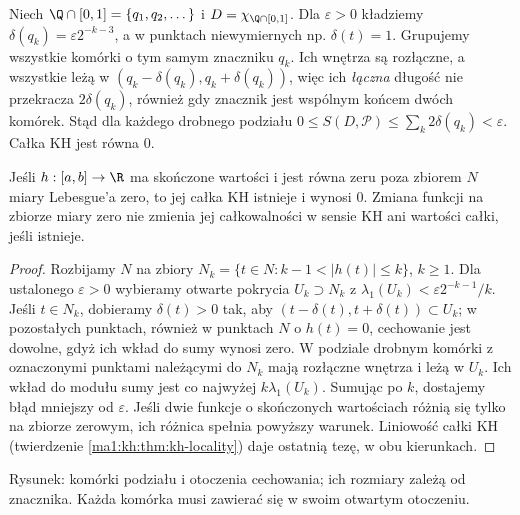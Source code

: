 \begin{przyklad}\label{ma1:kh:ex:dirichlet}
Niech $\Q\cap[0,1]=\{q_1,q_2,\dots\}$ i $D=\chi_{\Q\cap[0,1]}$. Dla $\varepsilon>0$ kładziemy $\delta(q_k)=\varepsilon 2^{-k-3}$, a w punktach niewymiernych np. $\delta(t)=1$. Grupujemy wszystkie komórki o tym samym znaczniku $q_k$. Ich wnętrza są rozłączne, a wszystkie leżą w $(q_k-\delta(q_k),q_k+\delta(q_k))$, więc ich \emph{łączna} długość nie przekracza $2\delta(q_k)$, również gdy znacznik jest wspólnym końcem dwóch komórek. Stąd dla każdego drobnego podziału $0\le S(D,\mathcal P)\le\sum_k 2\delta(q_k)<\varepsilon$. Całka KH jest równa $0$.
\end{przyklad}
\begin{lemat}\label{ma1:kh:lem:kh-null-modification}\label{it:lem:kh-null-modification}
Jeśli $h:[a,b]\to\R$ ma skończone wartości i jest równa zeru poza zbiorem $N$ miary Lebesgue'a zero, to jej całka KH istnieje i wynosi $0$. Zmiana funkcji na zbiorze miary zero nie zmienia jej całkowalności w sensie KH ani wartości całki, jeśli istnieje.
\end{lemat}
\begin{proof}
Rozbijamy $N$ na zbiory $N_k=\{t\in N:k-1<|h(t)|\le k\}$, $k\ge1$. Dla ustalonego $\varepsilon>0$ wybieramy otwarte pokrycia $U_k\supset N_k$ z $\lambda_1(U_k)<\varepsilon2^{-k-1}/k$. Jeśli $t\in N_k$, dobieramy $\delta(t)>0$ tak, aby $(t-\delta(t),t+\delta(t))\subset U_k$; w pozostałych punktach, również w punktach $N$ o $h(t)=0$, cechowanie jest dowolne, gdyż ich wkład do sumy wynosi zero. W podziale drobnym komórki z oznaczonymi punktami należącymi do $N_k$ mają rozłączne wnętrza i leżą w $U_k$. Ich wkład do modułu sumy jest co najwyżej $k\lambda_1(U_k)$. Sumując po $k$, dostajemy błąd mniejszy od $\varepsilon$.
 Jeśli dwie funkcje o skończonych wartościach różnią się tylko na zbiorze zerowym, ich różnica spełnia powyższy warunek. Liniowość całki KH (twierdzenie \ref{ma1:kh:thm:kh-locality}) daje ostatnią tezę, w obu kierunkach.
\end{proof}

\begin{center}

\small Rysunek: komórki podziału i otoczenia cechowania; ich rozmiary zależą od znacznika. Każda komórka musi zawierać się w swoim otwartym otoczeniu.
\end{center}
